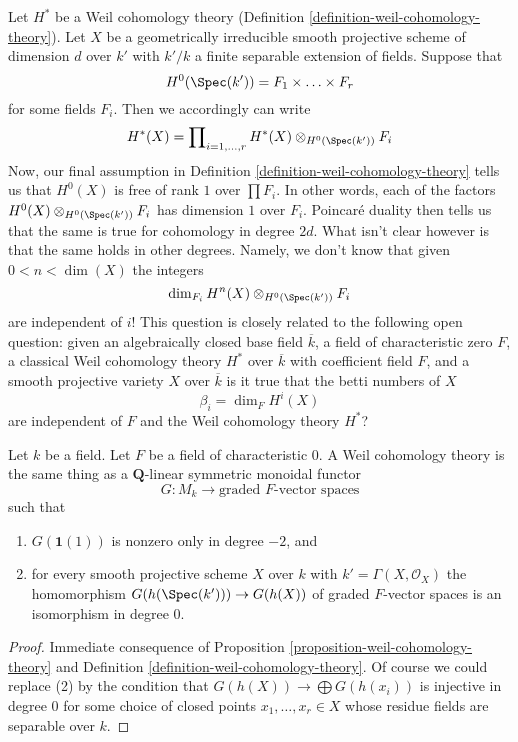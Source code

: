 \begin{remark}
\label{remark-betti-numbers-in-some-sense}
Let $H^*$ be a Weil cohomology theory
(Definition \ref{definition-weil-cohomology-theory}).
Let $X$ be a geometrically irreducible smooth projective scheme
of dimension $d$ over $k'$ with $k'/k$ a finite separable extension of fields.
Suppose that
$$
H^0(\Spec(k')) = F_1 \times \ldots \times F_r
$$
for some fields $F_i$. Then we accordingly can write
$$
H^*(X) = \prod\nolimits_{i = 1, \ldots, r}
H^*(X) \otimes_{H^0(\Spec(k'))} F_i
$$
Now, our final assumption in Definition \ref{definition-weil-cohomology-theory}
tells us that $H^0(X)$ is free of rank $1$ over $\prod F_i$.
In other words, each of the factors
$H^0(X) \otimes_{H^0(\Spec(k'))} F_i$ has dimension $1$ over $F_i$.
Poincar\'e duality then tells us that the same is true for
cohomology in degree $2d$.
What isn't clear however is that the same holds in other degrees.
Namely, we don't know that given $0 < n < \dim(X)$ the integers
$$
\dim_{F_i} H^n(X) \otimes_{H^0(\Spec(k'))} F_i
$$
are independent of $i$! This question is closely related to the following
open question: given an algebraically closed base field $\overline{k}$,
a field of characteristic zero $F$, a classical Weil cohomology theory
$H^*$ over $\overline{k}$ with coefficient field $F$, and a smooth projective
variety $X$ over $\overline{k}$ is it true that the betti numbers of $X$
$$
\beta_i = \dim_F H^i(X)
$$
are independent of $F$ and the Weil cohomology theory $H^*$?
\end{remark}

\begin{proposition}
\label{proposition-weil-cohomology-theory-again}
Let $k$ be a field. Let $F$ be a field of characteristic $0$.
A Weil cohomology theory is the same thing as a $\mathbf{Q}$-linear
symmetric monoidal functor
$$
G : M_k \longrightarrow \text{graded }F\text{-vector spaces}
$$
such that
\begin{enumerate}
\item $G(\mathbf{1}(1))$ is nonzero only in degree $-2$, and
\item for every smooth projective scheme $X$ over $k$ with
$k' = \Gamma(X, \mathcal{O}_X)$ the homomorphism
$G(h(\Spec(k'))) \to G(h(X))$ of graded $F$-vector spaces
is an isomorphism in degree $0$.
\end{enumerate}
\end{proposition}

\begin{proof}
Immediate consequence of Proposition \ref{proposition-weil-cohomology-theory}
and Definition \ref{definition-weil-cohomology-theory}. Of course we could
replace (2) by the condition that $G(h(X)) \to \bigoplus G(h(x_i))$
is injective in degree $0$ for some choice of closed points
$x_1, \ldots, x_r \in X$ whose residue fields are separable over $k$.
\end{proof}







